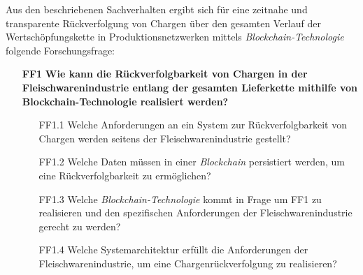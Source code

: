 


Aus den beschriebenen Sachverhalten ergibt sich für eine zeitnahe und transparente Rückverfolgung von Chargen über den gesamten Verlauf der Wertschöpfungskette in Produktionsnetzwerken mittels \textit{Blockchain-Technologie} folgende Forschungsfrage:

\begin{itemize}
  \item[\textbf{FF1}] \textbf{Wie kann die Rückverfolgbarkeit von Chargen in der Fleischwarenindustrie entlang der gesamten Lieferkette mithilfe von Blockchain-Technologie realisiert werden?}
  \begin{itemize}
    \item[FF1.1] Welche Anforderungen an ein System zur Rückverfolgbarkeit von Chargen werden seitens der Fleischwarenindustrie gestellt?
    \item[FF1.2] Welche Daten müssen in einer \textit{Blockchain} persistiert werden, um eine Rückverfolgbarkeit zu ermöglichen?
    \item[FF1.3] Welche \textit{Blockchain-Technologie} kommt in Frage um FF1 zu realisieren und den spezifischen Anforderungen der Fleischwarenindustrie gerecht zu werden?
    \item[FF1.4] Welche Systemarchitektur erfüllt die Anforderungen der Fleischwarenindustrie, um eine Chargenrückverfolgung zu realisieren?
  \end{itemize}
\end{itemize}


\newpage
